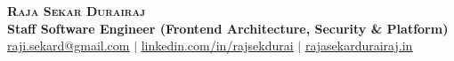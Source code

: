 \documentclass[letterpaper,11pt]{article}
\newcounter{TotalYears}
\begin{document}
\begin{center}
    \textbf{\Huge \scshape Raja Sekar Durairaj} \\ \vspace{5pt}
    \textbf{\large Staff Software Engineer (Frontend Architecture, Security \& Platform)} \\ \vspace{5pt}
    \small \href{mailto:raji.sekard@gmail.com}{\underline{raji.sekard@gmail.com}} $|$ 
    \href{https://www.linkedin.com/in/rajsekdurai}{\underline{linkedin.com/in/rajsekdurai}} $|$
    \href{https://www.rajasekardurairaj.in/}{\underline{rajasekardurairaj.in}}
\end{center}





\end{document}

